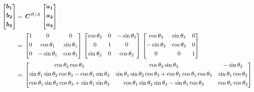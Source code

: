 \begin{align}{\label{eqn:C_B_AmatrixEuler}}
\begin{split}
\begin{bmatrix}
\bm{b_1}\\[0.3em]
\bm{b_2}\\[0.3em]
\bm{b_3}\\[0.3em]
\end{bmatrix}
& =\,
\bm{C}^{B/A}
\,
\begin{bmatrix}
\bm{a_1}\\[0.3em]
\bm{a_2}\\[0.3em]
\bm{a_3}\\[0.3em]
\end{bmatrix}
\\
& =\,
\begin{bmatrix}
1 & 0 & 0\\[0.3em]
0 & \cos\theta_1 & \sin\theta_1\\[0.3em]
0 & -\sin\theta_1 & \cos\theta_1\\[0.3em]
\end{bmatrix}
\,
\begin{bmatrix}
\cos\theta_2 & 0 & -\sin\theta_2\\[0.3em]
0 & 1 &0\\[0.3em]
\sin\theta_2 & 0 & \cos\theta_2\\[0.3em]
\end{bmatrix}
\,
\begin{bmatrix}
\cos\theta_3 & \sin\theta_3 & 0\\[0.3em]
-\sin\theta_3 & \cos\theta_3 & 0\\[0.3em]
0 & 0 & 1\\[0.3em]
\end{bmatrix}
\\
& =\,
\begin{bmatrix}
\cos\theta_2 \cos\theta_3 & \cos\theta_2 \sin\theta_3 & -\sin\theta_2\\[0.3em]
\sin\theta_1 \sin\theta_2 \cos\theta_3 - \cos\theta_1 \sin\theta_3 & \sin\theta_1 \sin\theta_2 \cos\theta_3 + \cos\theta_1 \cos\theta_1 \cos\theta_3 & \sin\theta_1 \cos\theta_2\\[0.3em]
\cos\theta_1 \sin\theta_2 \cos\theta_3 + \sin\theta_1 \sin\theta_3 & \cos\theta_1 \sin\theta_2 \sin\theta_3 - \sin\theta_1 \cos\theta_3 & \cos\theta_1 \cos\theta_2\\[0.3em]
\end{bmatrix}
\end{split}
\end{align}

